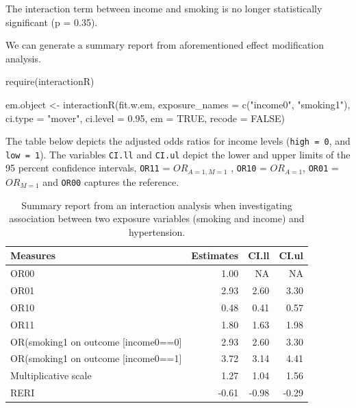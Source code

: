 \documentclass[
  letterpaper,
  DIV=11,
  numbers=noendperiod]{scrreprt}
\newenvironment{Shaded}{\begin{snugshade}}{\end{snugshade}}
\newcommand{\AttributeTok}[1]{\textcolor[rgb]{0.40,0.45,0.13}{#1}}
\newcommand{\ConstantTok}[1]{\textcolor[rgb]{0.56,0.35,0.01}{#1}}
\newcommand{\FloatTok}[1]{\textcolor[rgb]{0.68,0.00,0.00}{#1}}
\newcommand{\FunctionTok}[1]{\textcolor[rgb]{0.28,0.35,0.67}{#1}}
\newcommand{\NormalTok}[1]{\textcolor[rgb]{0.00,0.23,0.31}{#1}}
\newcommand{\OtherTok}[1]{\textcolor[rgb]{0.00,0.23,0.31}{#1}}
\newcommand{\StringTok}[1]{\textcolor[rgb]{0.13,0.47,0.30}{#1}}
\begin{document}
The interaction term between income and smoking is no longer
statistically significant (p = 0.35).

We can generate a summary report from aforementioned effect modification
analysis.

\begin{Shaded}
\begin{Highlighting}[]
\FunctionTok{require}\NormalTok{(interactionR)}

\NormalTok{em.object }\OtherTok{\textless{}{-}} \FunctionTok{interactionR}\NormalTok{(fit.w.em, }
                          \AttributeTok{exposure\_names =} \FunctionTok{c}\NormalTok{(}\StringTok{"income0"}\NormalTok{, }\StringTok{"smoking1"}\NormalTok{), }
                          \AttributeTok{ci.type =} \StringTok{"mover"}\NormalTok{, }\AttributeTok{ci.level =} \FloatTok{0.95}\NormalTok{, }
                          \AttributeTok{em =} \ConstantTok{TRUE}\NormalTok{, }\AttributeTok{recode =} \ConstantTok{FALSE}\NormalTok{)}
\end{Highlighting}
\end{Shaded}

The table below depicts the adjusted odds ratios for income levels
(\texttt{high\ =\ 0}, and \texttt{low\ =\ 1}). The variables
\texttt{CI.ll} and \texttt{CI.ul} depict the lower and upper limits of
the 95 percent confidence intervals, \texttt{OR11} =
\(OR_{A = 1, M = 1}\) , \texttt{OR10} = \(OR_{A = 1}\), \texttt{OR01} =
\(OR_{M = 1}\) and \texttt{OR00} captures the reference.

\hypertarget{tbl-effint-fit.w.em}{}
\begin{table}[!h]
\caption{\label{tbl-effint-fit.w.em}Summary report from an interaction analysis when investigating
association between two exposure variables (smoking and income) and
hypertension. }\tabularnewline

\centering
\begin{tabular}{lrrr}
\toprule
Measures & Estimates & CI.ll & CI.ul\\
\midrule
OR00 & 1.00 & NA & NA\\
OR01 & 2.93 & 2.60 & 3.30\\
OR10 & 0.48 & 0.41 & 0.57\\
OR11 & 1.80 & 1.63 & 1.98\\
OR(smoking1 on outcome [income0==0] & 2.93 & 2.60 & 3.30\\
\addlinespace
OR(smoking1 on outcome [income0==1] & 3.72 & 3.14 & 4.41\\
Multiplicative scale & 1.27 & 1.04 & 1.56\\
RERI & -0.61 & -0.98 & -0.29\\
\bottomrule
\end{tabular}
\end{table}
\end{document}

